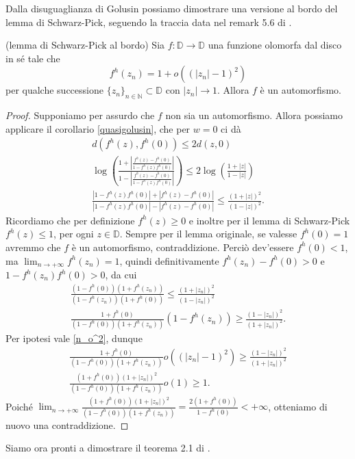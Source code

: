 Dalla disuguaglianza di Golusin possiamo dimostrare una versione al bordo del lemma di Schwarz-Pick, seguendo la traccia data nel remark 5.6 di \cite{BKR}.

\begin{thm} \label{boundary_schwarz_pick}
  (lemma di Schwarz-Pick al bordo) Sia $f:\mathbb{D} \longrightarrow \mathbb{D}$ una funzione olomorfa dal disco in sé tale che
  \begin{equation} \label{n_o^2}
    f^h(z_n)=1+o((|z_n|-1)^2)
  \end{equation}
  per qualche successione $\{z_n\}_{n \in \mathbb{N}} \subset \mathbb{D}$ con $|z_n| \longrightarrow 1$. Allora $f$ è un automorfismo.
\end{thm}

\begin{proof}
  Supponiamo per assurdo che $f$ non sia un automorfismo. Allora possiamo applicare il corollario \ref{quasigolusin}, che per $w=0$ ci dà
  \begin{align*}
    d(f^h(z), f^h(0)) \le 2d(z,0) \\
    \log{\left(\frac{1+\left|\frac{f^h(z)-f^h(0)}{1-f^h(z)f^h(0)}\right|}{1-\left|\frac{f^h(z)-f^h(0)}{1-f^h(z)f^h(0)}\right|}\right)} \le 2\log{\left(\frac{1+|z|}{1-|z|}\right)} \\
    \frac{|1-f^h(z)f^h(0)|+|f^h(z)-f^h(0)|}{|1-f^h(z)f^h(0)|-|f^h(z)-f^h(0)|} \le \frac{(1+|z|)^2}{(1-|z|)^2}.
  \end{align*}
  Ricordiamo che per definizione $f^h(z) \ge 0$ e inoltre per il lemma di Schwarz-Pick $f^h(z) \le 1$, per ogni $z \in \mathbb{D}$. Sempre per il lemma originale, se valesse $f^h(0)=1$ avremmo che $f$ è un automorfismo, contraddizione. Perciò dev'essere $f^h(0)<1$, ma $\displaystyle \lim_{n \longrightarrow +\infty} f^h(z_n)=1$, quindi definitivamente $f^h(z_n)-f^h(0)>0$ e $1-f^h(z_n)f^h(0)>0$, da cui
  \begin{align*}
    \frac{(1-f^h(0))(1+f^h(z_n))}{(1-f^h(z_n))(1+f^h(0))} \le \frac{(1+|z_n|)^2}{(1-|z_n|)^2} \\
    \frac{1+f^h(0)}{(1-f^h(0))(1+f^h(z_n))}(1-f^h(z_n)) \ge \frac{(1-|z_n|)^2}{(1+|z_n|)^2}.
  \end{align*}
  Per ipotesi vale \eqref{n_o^2}, dunque
  \begin{align*}
    \frac{1+f^h(0)}{(1-f^h(0))(1+f^h(z_n))}o((|z_n|-1)^2) \ge \frac{(1-|z_n|)^2}{(1+|z_n|)^2} \\
    \frac{(1+f^h(0))(1+|z_n|)^2}{(1-f^h(0))(1+f^h(z_n))}o(1) \ge 1.
  \end{align*}
  Poiché $\displaystyle \lim_{n \longrightarrow +\infty} \frac{(1+f^h(0))(1+|z_n|)^2}{(1-f^h(0))(1+f^h(z_n))}=\frac{2(1+f^h(0))}{1-f^h(0)} < +\infty$, otteniamo di nuovo una contraddizione.
\end{proof}

Siamo ora pronti a dimostrare il teorema 2.1 di \cite{BK}.
